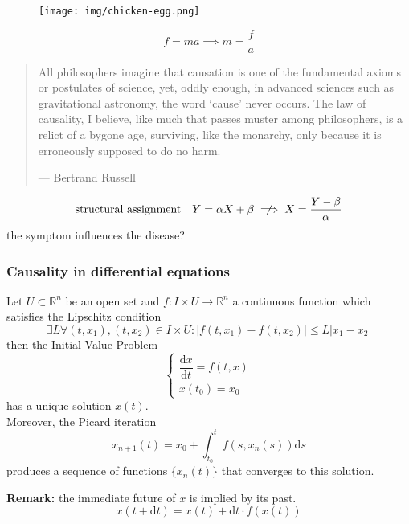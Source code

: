 \documentclass[UTF8,11pt,colorlinks,compress,openany]{beamer}%
\begin{document}
\begin{frame}\frametitle{}
\begin{figure}[H]
\texttt{[image: img/chicken-egg.png]}	
\end{figure}
\[f=ma\implies m=\frac{f}{a}\]
\begin{quote}
All philosophers imagine that causation is one of the fundamental axioms or postulates of science, yet, oddly enough, in advanced sciences such as gravitational astronomy, the word `cause' never occurs. The law of causality, I believe, like much that passes muster among philosophers, is a relict of a bygone age, surviving, like the monarchy, only because it is erroneously supposed to do no harm.\par
\hfill --- \textsf{Bertrand Russell}
\end{quote}
\[\text{structural assignment}\quad Y=\alpha X+\beta\centernot\implies X=\frac{Y-\beta}{\alpha}\]
the symptom influences the disease?
\end{frame}

\begin{frame}\frametitle{Causality in differential equations}
\setlength\abovedisplayskip{0pt}
\setlength\belowdisplayskip{0pt}
\begin{theorem}
Let $U\subset\mathbb{R}^n$ be an open set and $f:I\times U\to\mathbb{R}^n$ a continuous function which satisfies the Lipschitz condition
\[\exists L\forall (t,x_1),(t,x_2)\in I\times U: |f(t,x_1)-f(t,x_2)|\leq L|x_1-x_2|\]
then the Initial Value Problem
\[
\begin{cases}
\dfrac{\mathrm{d}x}{\mathrm{d}t}=f(t,x)\\
x(t_0)=x_0
\end{cases}
\]
has a unique solution $x(t)$.\\
Moreover, the Picard iteration
\[x_{n+1}(t)=x_0+\int_{t_0}^t f(s,x_n(s))\mathrm{d}s\]
produces a sequence of functions $\{x_n(t)\}$ that converges to this solution.
\end{theorem}
\textbf{Remark:} the immediate future of $x$ is implied by its past.
\[x(t+\mathrm{d}t)=x(t)+\mathrm{d}t\cdot f(x(t))\]
\end{frame}
\end{document}
